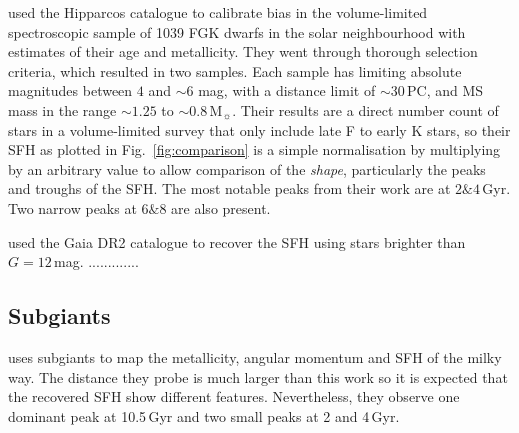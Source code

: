 \documentclass[fleqn,usenatbib]{mnras}
\begin{document}
\citet{2007ApJ...665..767R} used the Hipparcos catalogue to calibrate
bias in the \citep{2005ApJS..159..141V} volume-limited spectroscopic
sample of 1039 FGK dwarfs in the solar neighbourhood with estimates of
their age and metallicity. They went through thorough selection criteria,
which resulted in two samples. Each sample has limiting absolute magnitudes
between $4$ and $\sim$6 mag, with a distance limit of $\sim$30\,PC, and MS mass
in the range $\sim1.25$ to $\sim0.8$\,M$_{\sun}$. Their results are a direct
number count of stars in a volume-limited survey that only include late F to
early K stars, so their SFH as plotted in Fig.~\ref{fig:comparison} is a simple
normalisation by multiplying by an arbitrary value to allow comparison of the
\textit{shape}, particularly the peaks and troughs of the SFH. The most notable
peaks from their work are at $2 \& 4$\,Gyr. Two narrow peaks at $6 \& 8$ are
also present.

\citet{2019A&A...624L...1M} used the Gaia DR2 catalogue to recover the SFH
using stars brighter than $G=12$\,mag. .............

\subsection{Subgiants}
\citet{2022Natur.603..599X} uses subgiants to map the metallicity, angular
momentum and SFH of the milky way. The distance they probe is much larger
than this work so it is expected that the recovered SFH show different
features. Nevertheless, they observe one dominant peak at 10.5\,Gyr and two
small peaks at 2 and 4\,Gyr.
\end{document}
